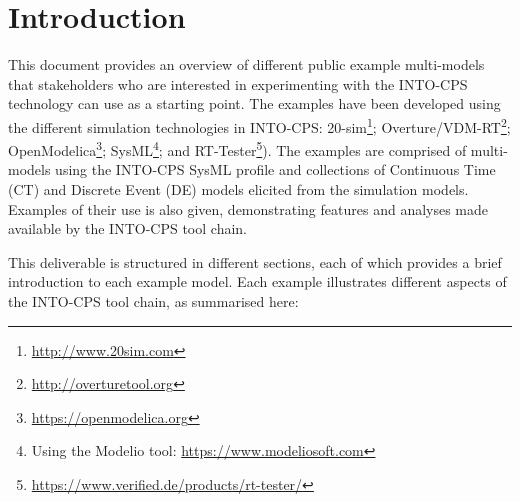 
\section{Introduction}\label{sec:intro}

This document provides an overview of different public example multi-models that stakeholders who are interested in experimenting with the INTO-CPS technology can use as a starting point. The examples have been developed using the different simulation technologies in INTO-CPS: 20-sim\footnote{\url{http://www.20sim.com}}; Overture/VDM-RT\footnote{\url{http://overturetool.org}}; OpenModelica\footnote{\url{https://openmodelica.org}}; SysML\footnote{Using the Modelio tool: \url{https://www.modeliosoft.com}}; and RT-Tester\footnote{\url{https://www.verified.de/products/rt-tester/}}). The examples are  comprised of multi-models using the INTO-CPS SysML profile and collections of Continuous Time (CT) and Discrete Event (DE) models elicited from the simulation models. Examples of their use is also given, demonstrating features and analyses made available by the INTO-CPS tool chain. 

This deliverable is structured in different sections, each of which provides a brief introduction to each example model. Each example illustrates different aspects of the INTO-CPS tool chain, as summarised here:

